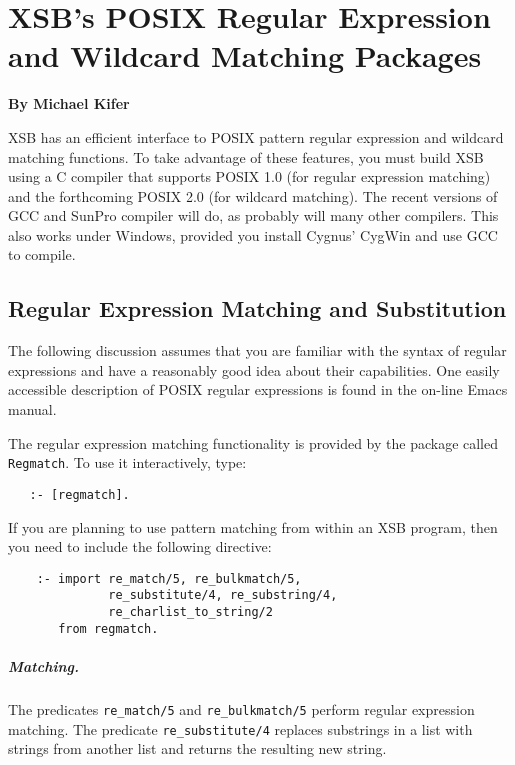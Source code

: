 \chapter{XSB's POSIX Regular Expression and Wildcard Matching Packages}
\label{chap-posix}

\begin{center}
{\Large {\bf By Michael Kifer}}
\end{center}

XSB has an efficient interface to POSIX pattern regular expression and
wildcard matching functions.  To take advantage of these features, you must
build XSB using a C compiler that supports POSIX 1.0 (for regular
expression matching) and the forthcoming POSIX 2.0 (for wildcard matching).
The recent versions of GCC and SunPro compiler will do, as probably will
many other compilers. This also works under Windows, provided you install
Cygnus' CygWin and use GCC to compile.

\section{Regular Expression Matching and Substitution}

The following discussion assumes that you are familiar with the syntax of
regular expressions and have a reasonably good idea about their
capabilities. One easily accessible description of POSIX regular
expressions is found in the on-line Emacs manual.

The regular expression matching functionality is provided by the package
called {\tt Regmatch}. To use it interactively, type:
\begin{verbatim}
   :- [regmatch].
\end{verbatim}

If you are planning to use pattern matching from within an XSB program,
then you need to include the following directive:
\begin{verbatim}
    :- import re_match/5, re_bulkmatch/5,
              re_substitute/4, re_substring/4,
              re_charlist_to_string/2
       from regmatch.
\end{verbatim}

\paragraph{Matching.}
The predicates \verb|re_match/5| and \verb|re_bulkmatch/5| perform regular
expression matching.  The predicate \verb|re_substitute/4| replaces
substrings in a list with strings from another list and returns the
resulting new string.

